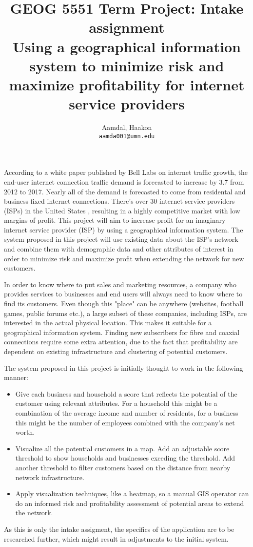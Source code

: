 \documentclass{article}
\title{
    GEOG 5551 Term Project: Intake assignment\\
    Using a geographical information system to minimize risk and maximize profitability for internet service providers
}
\author{
    Aamdal, Haakon\\
    \texttt{aamda001@umn.edu}
}
\begin{document}
\maketitle

According to a white paper published by Bell Labs \cite{Bell_Labs2013-st} on internet traffic growth, the end-user internet connection traffic demand is forecasted to increase by 3.7 from 2012 to 2017. Nearly all of the demand is forecasted to come from residental and business fixed internet connections. There's over 30 internet service providers (ISPs) in the United States \cite{noauthor_undated-uf}, resulting in a highly competitive market with low margins of profit. This project will aim to increase profit for an imaginary internet service provider (ISP) by using a geographical information system. The system proposed in this project will use existing data about the ISP's network and combine them with demographic data and other attributes of interest in order to minimize risk and maximize profit when extending the network for new customers.

In order to know where to put sales and marketing resources, a company who provides services to businesses and end users will always need to know where to find its customers. Even though this "place" can be anywhere (websites, football games, public forums etc.), a large subset of these companies, including ISPs, are interested in the actual physical location. This makes it suitable for a geographical information system. Finding new subscribers for fibre and coaxial connections require some extra attention, due to the fact that profitability are dependent on existing infrastructure and clustering of potential customers.

The system proposed in this project is initially thought to work in the following manner:
\begin{itemize}
    \item Give each business and household a score that reflects the potential of the customer using relevant attributes. For a household this might be a combination of the average income and number of residents, for a business this might be the number of employees combined with the company's net worth.
    \item Visualize all the potential customers in a map. Add an adjustable score threshold to show households and businesses exceding the threshold. Add another threshold to filter customers based on the distance from nearby network infrastructure.
    \item Apply visualization techniques, like a heatmap, so a manual GIS operator can do an informed risk and profitability assessment of potential areas to extend the network.
\end{itemize}
As this is only the intake assigment, the specifics of the application are to be researched further, which might result in adjustments to the initial system.
\end{document}
